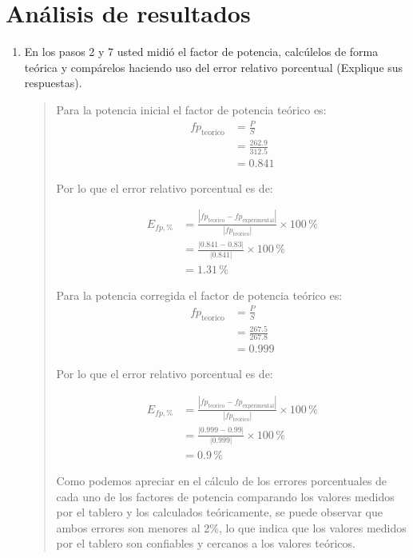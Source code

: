 \documentclass[12pt,a4paper]{article}
\begin{document}
\section{Análisis de resultados}
\begin{enumerate}
    \item En los pasos 2 y 7 usted midió el factor de potencia, calcúlelos de forma teórica y compárelos haciendo uso del error relativo porcentual (Explique sus respuestas).
    
    \begin{quote}
        Para la potencia inicial el factor de potencia teórico es:
        \begin{align*}
            f{p_\text{teorico}} &= \frac{P}{S}\\
            &=\frac{262.9}{312.5}\\
            &=0.841
        \end{align*}

        Por lo que el error relativo porcentual es de:

        \begin{align*}
            E_{fp,\%}&=\frac{|f{p_\text{teorico}}-f{p_\text{experimental}}|}{|f{p_\text{teorico}}|}\times100\,\text{\%}\\
            &=\frac{|0.841-0.83|}{|0.841|}\times100\,\text{\%}\\
            &=1.31\,\text{\%}
        \end{align*}

        Para la potencia corregida el factor de potencia teórico es:
        \begin{align*}
            f{p_\text{teorico}} &= \frac{P}{S}\\
            &=\frac{267.5}{267.8}\\
            &=0.999
        \end{align*}

        Por lo que el error relativo porcentual es de:

        \begin{align*}
            E_{fp,\%}&=\frac{|f{p_\text{teorico}}-f{p_\text{experimental}}|}{|f{p_\text{teorico}}|}\times100\,\text{\%}\\
            &=\frac{|0.999-0.99|}{|0.999|}\times100\,\text{\%}\\
            &=0.9\,\text{\%}
        \end{align*}

        Como podemos apreciar en el cálculo de los errores porcentuales de cada uno de los factores de potencia comparando los valores medidos por el tablero y los calculados teóricamente, se puede observar que ambos errores son menores al 2\%, lo que indica que los valores medidos por el tablero son confiables y cercanos a los valores teóricos.
    \end{quote}
    

\end{enumerate}
\end{document}
